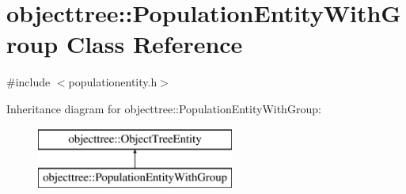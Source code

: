 \hypertarget{classobjecttree_1_1_population_entity_with_group}{}\section{objecttree\+::Population\+Entity\+With\+Group Class Reference}
\label{classobjecttree_1_1_population_entity_with_group}


{\ttfamily \#include $<$populationentity.\+h$>$}

Inheritance diagram for objecttree\+::Population\+Entity\+With\+Group\+:\begin{figure}[H]
\begin{center}
\leavevmode
\includegraphics[height=2.000000cm]{d6/d3c/classobjecttree_1_1_population_entity_with_group}
\end{center}
\end{figure}
